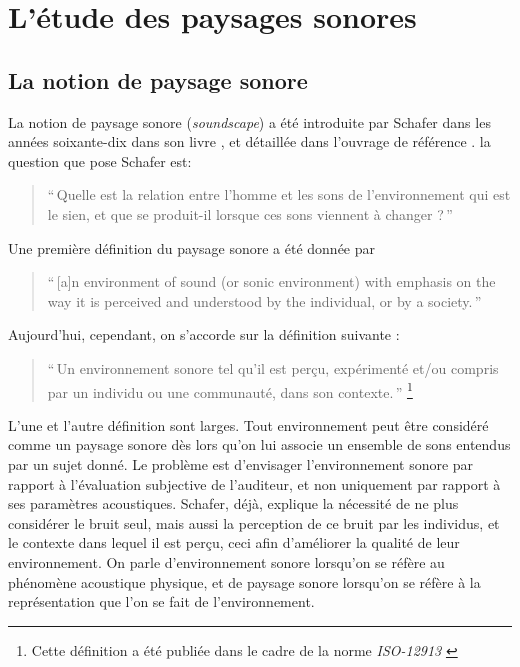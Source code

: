 
\section{L'étude des paysages sonores}
\label{sec:paysageSonore}

\subsection{La notion de paysage sonore}

La notion de paysage sonore (\emph{soundscape}) a été introduite par Schafer dans les années soixante-dix dans son livre \citep{schafer1969new}, et détaillée dans l'ouvrage de référence \citep{schafer1977tuning}. la question que pose Schafer est:

\begin{quote}
``\,Quelle est la relation entre l'homme et les sons de l'environnement qui est le sien, et que se produit-il lorsque ces sons viennent à changer ?\,''
\end{quote}

Une première définition du paysage sonore a été donnée par \citep{truax1978handbook}

\begin{quote}
``\,[a]n environment of sound (or sonic environment) with emphasis on the way it is perceived and understood by the individual, or by a society.\,'' 
\end{quote}

Aujourd'hui, cependant, on s'accorde sur la définition suivante \citep{aletta2016soundscape}:

\begin{quote}
``\,Un environnement sonore tel qu'il est perçu, expérimenté et/ou compris par un individu ou une communauté, dans son contexte.\,'' \footnote{Cette définition a été publiée dans le cadre de la norme \emph{ISO-12913} \citep{iso12913}}
\end{quote}

L'une et l'autre définition sont larges. Tout environnement peut être considéré comme un paysage sonore dès lors qu'on lui associe un ensemble de sons entendus par un sujet donné. Le problème est d'envisager l’environnement sonore par rapport à l'évaluation subjective de l'auditeur, et non uniquement par rapport à ses paramètres acoustiques. Schafer, déjà, explique la nécessité de ne plus considérer le bruit seul, mais aussi la perception de ce bruit par les individus, et le contexte dans lequel il est perçu, ceci afin d'améliorer la qualité de leur environnement. On parle d'environnement sonore lorsqu'on se réfère au phénomène acoustique physique, et de paysage sonore  lorsqu'on se réfère à la représentation que l'on se fait de l'environnement.

